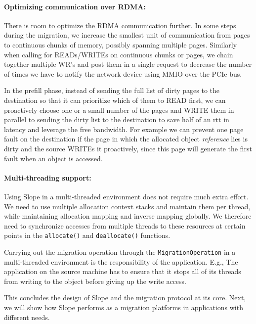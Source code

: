 \paragraph{Optimizing communication over RDMA:} There is room to optimize
the RDMA communication further. In some steps during the migration, we
increase the smallest unit of communication from pages to continuous chunks
of memory, possibly spanning multiple pages. Similarly when calling for
READs/WRITEs on continuous chunks or pages, we chain together multiple
WR's and post them in a single request to decrease the number of times we
have to notify the network device using MMIO over the PCIe bus.

In the prefill phase, instead of sending the full list of dirty pages to the
destination so that it can prioritize which of them to READ first, we can
proactively choose one or a small number of the pages and WRITE them in
parallel to sending the dirty list to the destination to save half of an rtt
in latency and leverage the free bandwidth.
For example we can prevent one page fault on the destination
if the page in which the allocated object \emph{reference} lies is dirty and
the source WRITEs it proactively, since this page will generate the first
fault when an object is accessed.


\paragraph{Multi-threading support:} Using Slope in a multi-threaded
environment does not require much extra effort. We need to use multiple
allocation context stacks and maintain them per thread, while maintaining
allocation mapping and inverse mapping globally. We therefore need to
synchronize accesses from multiple threads to these resources at certain points
in the \texttt{allocate()} and \texttt{deallocate()} functions.

Carrying out the migration operation through the \texttt{MigrationOperation}
in a multi-threaded environment is the responsibility of the application. E.g.,
The application on the source machine has to ensure that it stops all of
its threads from writing to the object before giving up the write access.

This concludes the design of Slope and the migration protocol at its core.
Next, we will show how Slope performs as a migration platforms in applications
with different needs.
